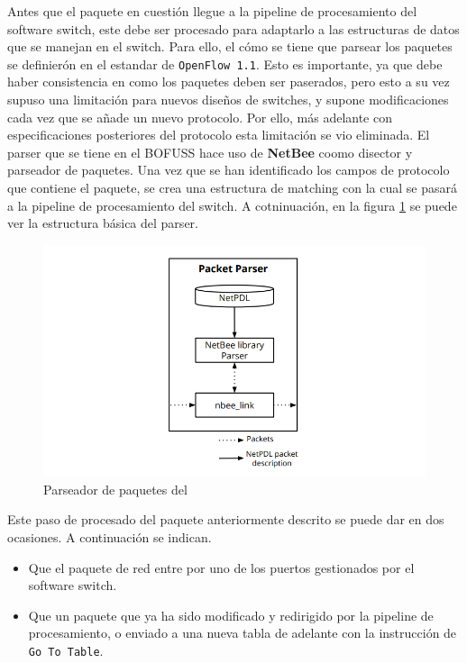 Antes que el paquete en cuestión llegue a la pipeline de procesamiento del software switch, este debe ser procesado para adaptarlo a las estructuras de datos que se manejan en el switch. Para ello, el cómo se tiene que parsear los paquetes se definierón en el estandar de \texttt{OpenFlow 1.1}. Esto es importante, ya que debe haber consistencia en como los paquetes deben ser paserados, pero esto a su vez supuso una limitación para nuevos diseños de switches, y supone modificaciones cada vez que se añade un nuevo protocolo. Por ello, más adelante con especificaciones posteriores del protocolo esta limitación se vio eliminada. El parser que se tiene en el BOFUSS hace uso de \textbf{NetBee} coomo disector y parseador de paquetes. Una vez que se han identificado los campos de protocolo que contiene el paquete, se crea una estructura de matching con la cual se pasará a la pipeline de procesamiento del switch. A cotninuación, en la figura \ref{fig:bofuss3} se puede ver la estructura básica del parser.

\begin{figure}[ht]
    \centering
    \includegraphics[width=\textwidth]{archivos/img/teoria/bofuss3.png}
    \caption{Parseador de paquetes del }
    \label{fig:bofuss3}
\end{figure}

Este paso de procesado del paquete anteriormente descrito se puede dar en dos ocasiones. A continuación se indican.

\begin{itemize}
    \item Que el paquete de red entre por uno de los puertos gestionados por el software switch.
    \item Que un paquete que ya ha sido modificado y redirigido por la pipeline de procesamiento, o enviado a una nueva tabla de adelante con la instrucción de \texttt{Go To Table}.
\end{itemize}

